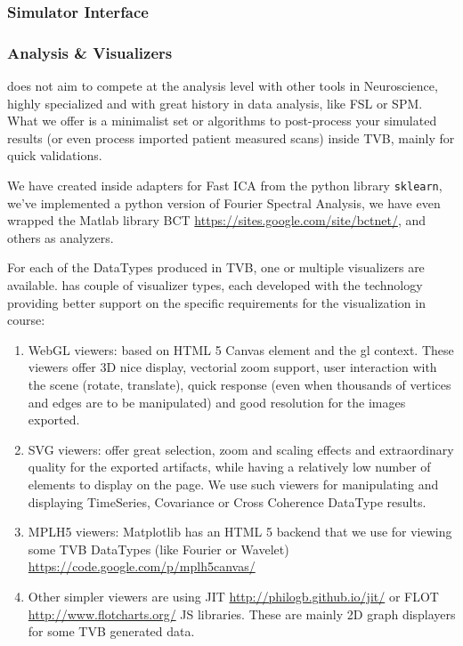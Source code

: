 	\subsubsection{Simulator Interface}
	
	\subsubsection{Analysis \& Visualizers}

\TVB does not aim to compete at the analysis level with other tools in Neuroscience, 
highly specialized and with great history in data analysis, like  FSL or SPM. 
What we offer is a minimalist set or algorithms to post-process your 
simulated results (or even process imported patient measured scans) inside TVB, mainly for quick validations.

We have created inside \TVB adapters for Fast ICA from the python library \texttt{sklearn}, 
we've implemented a python version of Fourier Spectral Analysis, 
we have even wrapped the Matlab library BCT \url{https://sites.google.com/site/bctnet/}, and others as analyzers.

For each of the DataTypes produced in TVB, one or multiple visualizers are available.	
\TVB has couple of  visualizer types, each developed with the technology providing better support on the specific requirements for the visualization in course:

\begin{enumerate}

	\item WebGL viewers: based on HTML 5 Canvas element and the gl context. 
	These viewers offer 3D nice display, vectorial zoom support, user interaction with the scene (rotate, translate), quick response 
	(even when thousands of vertices and edges are to be manipulated) and good resolution for the images exported.
	
	\item SVG viewers: offer great selection, zoom and scaling effects and extraordinary quality for the exported artifacts, while having 
	a relatively low number of elements to display on the page. 
	We use such viewers for manipulating and displaying TimeSeries, Covariance or Cross Coherence DataType results.
	
	\item MPLH5 viewers: Matplotlib has an HTML 5 backend that we use for viewing some TVB DataTypes (like Fourier or Wavelet)
	\url{https://code.google.com/p/mplh5canvas/}
	
	\item Other simpler viewers are using JIT \url{http://philogb.github.io/jit/} or FLOT \url{http://www.flotcharts.org/} JS libraries.
	These are mainly 2D graph displayers for some TVB generated data.

\end{enumerate}

